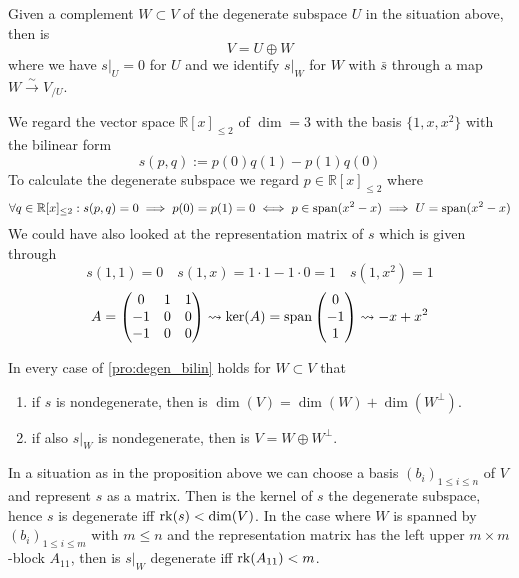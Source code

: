 \begin{corollary}\label{cor:degen_space_sum}
   Given a complement \(W \subset V\) of the degenerate subspace \(U\) in the situation above, then is
   \[V = U \oplus W\]
   where we have \(s\rvert_U = 0\) for \(U\) and we identify \(s\rvert_W\) for \(W\) with \(\bar{s}\) through a map \(W \xrightarrow{\sim} V_{/U}\).
\end{corollary}
\begin{example}
   We regard the vector space \(\mathbb{R}[x]_{\leq 2}\) of \(\dim = 3\) with the basis \(\{1, x, x^2\}\) with the bilinear form
   \[s(p, q) := p(0)q(1) - p(1)q(0)\]
   To calculate the degenerate subspace we regard \(p \in \mathbb{R}[x]_{\leq 2}\) where
   \[\forall q \in \mathbb{R}[x]_{\leq 2}: s(p, q) = 0 \implies p(0) = p(1) = 0 \iff p \in \operatorname{span}(x^2 - x) \implies U = \operatorname{span}(x^2 -x)\]
   We could have also looked at the representation matrix of \(s\) which is given through
   \[s(1, 1) = 0 \quad s(1, x) = 1 \cdot 1 - 1 \cdot 0 = 1 \quad s(1, x^2) = 1\]
   \[A = \begin{pmatrix}0 & 1 & 1\\-1 & 0 & 0\\-1 & 0 & 0\end{pmatrix} \rightsquigarrow \ker(A) = \operatorname{span}\begin{pmatrix}0\\-1\\1\end{pmatrix} \rightsquigarrow -x + x^2\]
\end{example}

\begin{proposition}\label{pro:nondegen_direct_sum}
   In every case of \cref{pro:degen_bilin} holds for \(W \subset V\) that
   \begin{enumerate}[label=\roman*, align=Center]
      \item if \(s\) is nondegenerate, then is \(\dim(V) = \dim(W) + \dim(W^\perp)\).
      \item if also \(s\rvert_W\) is nondegenerate, then is \(V = W \oplus W^\perp\).
   \end{enumerate}
\end{proposition}

In a situation as in the proposition above we can choose a basis \((b_i)_{1\leq i \leq n}\) of \(V\) and represent \(s\) as a matrix.
Then is the kernel of \(s\) the degenerate subspace, hence \(s\) is degenerate iff \(\operatorname{rk}(s) < \dim(V)\).
In the case where \(W\) is spanned by \((b_i)_{1 \leq i \leq m}\) with \(m \leq n\) and the representation matrix has the left upper \(m\times m\)-block \(A_{11}\), then is \(s\rvert_W\) degenerate iff \(\operatorname{rk}(A_{11}) < m\).

